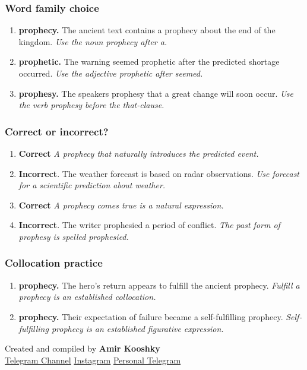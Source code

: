 \documentclass[11pt]{article}
\begin{document}
\subsubsection{Word family choice}
\begin{enumerate}
  \item \textbf{prophecy.} The ancient text contains a prophecy about the end of the kingdom. \emph{Use the noun prophecy after a.}
  \item \textbf{prophetic.} The warning seemed prophetic after the predicted shortage occurred. \emph{Use the adjective prophetic after seemed.}
  \item \textbf{prophesy.} The speakers prophesy that a great change will soon occur. \emph{Use the verb prophesy before the that-clause.}
\end{enumerate}

\subsubsection{Correct or incorrect?}
\begin{enumerate}
  \item \textbf{Correct} \emph{A prophecy that naturally introduces the predicted event.}
  \item \textbf{Incorrect}. The weather forecast is based on radar observations. \emph{Use forecast for a scientific prediction about weather.}
  \item \textbf{Correct} \emph{A prophecy comes true is a natural expression.}
  \item \textbf{Incorrect}. The writer prophesied a period of conflict. \emph{The past form of prophesy is spelled prophesied.}
\end{enumerate}

\subsubsection{Collocation practice}
\begin{enumerate}
  \item \textbf{prophecy.} The hero's return appears to fulfill the ancient prophecy. \emph{Fulfill a prophecy is an established collocation.}
  \item \textbf{prophecy.} Their expectation of failure became a self-fulfilling prophecy. \emph{Self-fulfilling prophecy is an established figurative expression.}
\end{enumerate}

\vfill
\begin{center}
\small\color{Muted} Created and compiled by \textbf{Amir Kooshky}\\
\href{https://t.me/KooshkyTOEFL}{Telegram Channel}\quad\textbullet\quad
\href{https://www.instagram.com/kooshkytoefl}{Instagram}\quad\textbullet\quad
\href{https://t.me/KooshkyTOEFL\_pv}{Personal Telegram}
\end{center}
\end{document}
